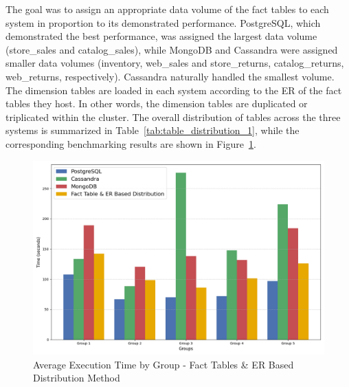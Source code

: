 \documentclass[conference]{IEEEtran}
\begin{document}
The goal was to assign an appropriate data volume of the fact tables to each system in proportion to its demonstrated performance. PostgreSQL, which demonstrated the best performance, was assigned the largest data volume (store\_sales and catalog\_sales), while MongoDB and Cassandra were assigned smaller data volumes (inventory, web\_sales and store\_returns, catalog\_returns, web\_returns, respectively). Cassandra naturally handled the smallest volume. The dimension tables are loaded in each system according to the ER of the fact tables they host. In other words, the dimension tables are duplicated or triplicated within the cluster.
The overall distribution of tables across the three systems is summarized in Table~\ref{tab:table_distribution_1}, while the corresponding benchmarking results are shown in Figure~\ref{fig:dist_method_1}.

\begin{figure}[htbp]
    \centering
    \includegraphics[width=\linewidth]{figures/dist_method_1.png}
    \caption{Average Execution Time by Group - Fact Tables \& ER Based Distribution Method}
    \label{fig:dist_method_1}
\end{figure}
\end{document}
